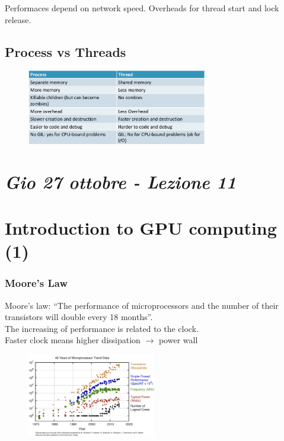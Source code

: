 Performaces depend on network speed. Overheads for thread start and lock release.


\subsection{Process vs Threads}

\begin{figure}[ht]
    \centering
    \includegraphics[width=0.7\textwidth]{figure_parallel/process_vs_thread.png}\end{figure}
\FloatBarrier



\newpage
\section{\textit{Gio 27 ottobre - Lezione 11}}
\section{Introduction to GPU computing (1)}

\subsubsection{Moore's Law}

Moore’s law: “The performance of microprocessors and the number of their transistors will double every 18 months”.\\
The increasing of performance is related to the clock.\\
Faster clock means higher dissipation $\rightarrow$ power wall

\begin{figure}[ht]
	\centering
	\includegraphics[width=0.5\textwidth]{figure_parallel/moore.png}\end{figure}
\FloatBarrier


